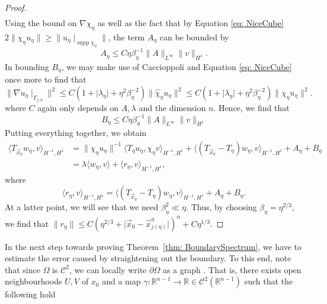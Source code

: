 \documentclass[a4paper,reqno]{amsart}
\numberwithin{equation}{section}
\numberwithin{equation}{section}		%
\numberwithin{figure}{section}			%
\numberwithin{table}{section}				%
\theoremstyle{definition}
\renewcommand{\hat}{\widehat}
\newcommand{\<}{\ensuremath \leq}
\renewcommand{\>}{\ensuremath \geq}
\renewcommand{\hat}{\widehat}
\begin{document}
\begin{proof}
\begin{equation}
\begin{aligned}
        \end{aligned}
    \end{equation}
    Using the bound on $\nabla \chi_\eta$ as well as the fact that by Equation \ref{eq: NiceCube} $2\lVert \chi_\eta u_\eta\rVert\geq \lVert u_\eta\mid_{\operatorname{supp}\chi_\eta}\rVert$, the term $A_\eta$ can be bounded by 
    \begin{equation}
        A_\eta\leq C\eta\beta_\eta^{-1}\lVert A\rVert_{L^\infty}\lVert v\rVert_{H^1}.
    \end{equation}
   In bounding $B_\eta$, we may make use of Caccioppoli and Equation \ref{eq: NiceCube}                                                     once more to find that 
   \begin{equation}
       \lVert \nabla u_\eta\mid_{\Gamma_{j,\eta}}\rVert^2 \leq C(1 + \lvert \lambda_\eta\rvert + \eta^2\beta_\eta^{-2})\lVert \hat{\chi}_\eta u_\eta\rVert^2\leq C(1 + \lvert \lambda_\eta\rvert + \eta^2\beta_\eta^{-2})\lVert \chi_\eta u_\eta\rVert^2.
   \end{equation}
    where $C$ again only depends on $A,\lambda$ and the dimension $n$. Hence, we find that
    \begin{equation}
        B_\eta \leq C\eta \beta_\eta^{-1}\lVert A\rVert_{L^\infty}\lVert v\rVert_{H^1}
    \end{equation}
    Putting everything together, we obtain
    \begin{equation}
        \begin{aligned}
            \langle T_{\vec{x}_0}w_\eta,v\rangle_{H^{-1},H^1} &= \lVert \chi_\eta u_\eta\rVert^{-1}\langle T_{\eta}u_\eta,\chi_\eta v\rangle_{H^{-1},H^1}+ \langle (T_{\vec{x}_0} -T_{\eta})w_\eta,v \rangle_{H^{-1},H^{1}} + A_\eta + B_\eta\\
            &= \lambda \langle w_\eta,v\rangle + \langle r_\eta,v\rangle_{H^{-1},H^1},
        \end{aligned}
    \end{equation}
    where
    \begin{equation}
        \langle r_\eta,v\rangle_{H^{-1},H^1} = \langle (T_{\vec{x}_0} -T_{\eta})w_\eta,v \rangle_{H^{-1},H^{1}} + A_\eta + B_\eta.
    \end{equation}
    At a latter point, we will see that we need $\beta_\eta^2\ll\eta$. Thus, by choosing $\beta_\eta = \eta^{2/3}$, we find that $\lVert r_\eta\rVert\leq C(\eta^{2/3} + \lvert \vec{x}_0 - \vec{x}_{j(\eta)}^\eta\rvert)^\alpha + C\eta^{1/3}$.
\end{proof}
In the next step towards proving Theorem~\ref{thm: BoundarySpectrum}, we have to estimate the error caused by straightening out the boundary. To this end, note that since $\Omega$ is $\mathcal{C}^{2}$, we can locally write $\partial \Omega$ as a graph \cite{evans2022partial}. That is, there exists open neighbourhoods $U,V$ of $x_0$ and a map $\gamma: \mathbb{R}^{n-1}\rightarrow\mathbb{R}\in \mathcal{C}^2(\mathbb{R}^{n-1})$ such that the following hold
\end{document}
